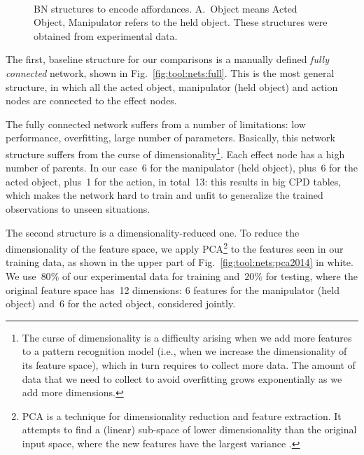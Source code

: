 \begin{figure}
\centering
{} \\
%
\caption[\StructureLearning{} \acl{BN} structures to encode \intobj{} affordances.]{\StructureLearning{} \acl{BN} structures to encode \intobj{} affordances.
A.~Object means Acted Object, Manipulator refers to the held object.
These structures were obtained from experimental data.}
\label{fig:tool:nets:structure_learning}
\end{figure}

The first, baseline structure for our comparisons is a manually defined \emph{fully connected} network, shown in Fig.~\ref{fig:tool:nets:full}.
This is the most general structure, in which all the acted object, manipulator (held object) and action nodes are connected to the effect nodes.

The fully connected network suffers from a number of limitations: low performance, overfitting, large number of parameters.
Basically, this network structure suffers from the curse of dimensionality\footnote{%
The curse of dimensionality \cite[p.~33]{bishop:prml} is a difficulty arising when we add more features to a pattern recognition model (i.e., when we increase the dimensionality of its feature space), which in turn requires to collect more data. The amount of data that we need to collect to avoid overfitting grows exponentially as we add more dimensions.}. %
Each effect node has a high number of parents.
In our case~6 for the manipulator (held object), plus~6 for the acted object, plus~1 for the action, in total~13: this results in big \ac{CPD} tables, which makes the network hard to train and unfit to generalize the trained observations to unseen situations.

The second structure is a dimensionality-reduced one.
To reduce the dimensionality of the feature space, we apply \acf{PCA}\footnote{%
\ac{PCA} is a technique for dimensionality reduction and feature extraction.
It attempts to find a (linear) sub-space of lower dimensionality than the original input space, where the new features have the largest variance \cite[p.~561]{bishop:prml}.%
} to the features seen in our training data, as shown in the upper part of Fig.~\ref{fig:tool:nets:pca2014} in white.
We use~$80\%$ of our experimental data for training and~$20\%$ for testing,
where the original feature space has~12 dimensions:
6 features for the manipulator (held object) and~6 for the acted object, considered jointly.


